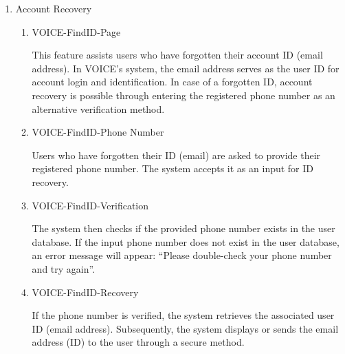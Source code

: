 \documentclass[conference]{IEEEtran}
\begin{document}
\begin{enumerate}[label=\arabic*]
    \vspace{1em}
    
    \item Account Recovery\par
    \vspace{0.3em}

    \begin{enumerate}[label=\arabic*)]
        \item VOICE-FindID-Page\par
        \vspace{0.3em}
        This feature assists users who have forgotten their account ID (email address). In VOICE's system, the email address serves as the user ID for account login and identification. In case of a forgotten ID, account recovery is possible through entering the registered phone number as an alternative verification method. 

        \vspace{1em}

        \item VOICE-FindID-Phone Number\par
        \vspace{0.3em}
        Users who have forgotten their ID (email) are asked to provide their registered phone number. The system accepts it as an input for ID recovery.

        \vspace{1em}

        \item VOICE-FindID-Verification\par
        \vspace{0.3em}
        The system then checks if the provided phone number exists in the user database. If the input phone number does not exist in the user database, an error message will appear: “Please double-check your phone number and try again”.

        \vspace{1em}

        \item VOICE-FindID-Recovery\par
        \vspace{0.3em}
        If the phone number is verified, the system retrieves the associated user ID (email address). Subsequently, the system displays or sends the email address (ID) to the user through a secure method. 
    \end{enumerate}   


\end{enumerate}
\end{document}
